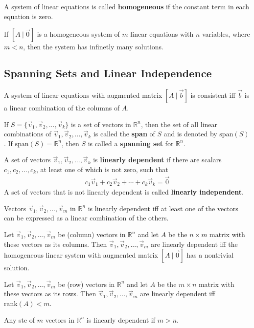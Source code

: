 \documentclass{article}
\begin{document}
\begin{definition}
    A system of linear equations is called \textbf{homogeneous} if the constant term in each equation is zero.
\end{definition}
\begin{theorem}
    If $[A\:|\:\vec 0]$ is a homogeneous system of $m$ linear equations with $n$ variables, where $m < n$, then the system has infinetly many solutions.
\end{theorem}
\subsection{Spanning Sets and Linear Independence}
\begin{theorem}
    A system of linear equations with augmented matrix $[A\:|\:\vec b]$ is consistent iff $\vec b$ is a linear combination of the columns of $A$.
\end{theorem}
\begin{definition}
    If $S=\{\vec v_1, \vec v_2, ..., \vec v_k\}$ is a set of vectors in $\mathbb{R}^n$, then the set of all linear combinations of $\vec v_1, \vec v_2, ..., \vec v_k$ is called the \textbf{span} of $S$ and is denoted by $\text{span}(S)$. If $\text{span}(S)=\mathbb{R}^n$, then $S$ is called a \textbf{spanning set} for $\mathbb{R}^n$.
\end{definition}
\begin{definition}
    A set of vectors $\vec v_1, \vec v_2, ..., \vec v_k$ is \textbf{linearly dependent} if there are scalars $c_1, c_2, ..., c_k$, at least one of which is not zero, such that
    \begin{gather*}
        c_1\vec v_1 + c_2\vec v_2 + \cdots + c_k\vec v_k = \vec 0
    \end{gather*}
    A set of vectors that is not linearly dependent is called \textbf{linearly independent}.
\end{definition}
\begin{theorem}
    Vectors $\vec v_1, \vec v_2, ..., \vec v_m$ in $\mathbb{R}^n$ is linearly dependent iff at least one of the vectors can be expressed as a linear combination of the others.
\end{theorem}
\begin{theorem}
    Let $\vec v_1, \vec v_2, ..., \vec v_m$ be (column) vectors in $\mathbb{R}^n$ and let $A$ be the $n\times m$ matrix with these vectors as its columns. Then $\vec v_1, \vec v_2, ..., \vec v_m$ are linearly dependent iff the homogeneous linear system with augmented matrix $[A\:|\:\vec 0]$ has a nontrivial solution.
\end{theorem}
\begin{theorem}
    Let $\vec v_1, \vec v_2, ..., \vec v_m$ be (row) vectors in $\mathbb{R}^n$ and let $A$ be the $m\times n$ matrix with these vectors as its rows. Then $\vec v_1, \vec v_2, ..., \vec v_m$ are linearly dependent iff $\text{rank}(A) < m$.
\end{theorem}
\begin{theorem}
    Any ste of $m$ vectors in $\mathbb{R}^n$ is linearly dependent if $m > n$.
\end{theorem}
\end{document}
